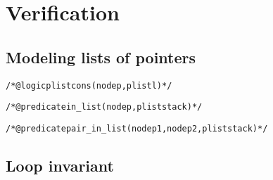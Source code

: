 
\section{Verification}
\label{sec:proof}

\subsection{Modeling lists of pointers}

\begin{alltt}
\begin{slshape}
/*@ logic plist cons(node p, plist l) */

/*@ predicate in_list(node p,plist stack) */

/*@ predicate pair_in_list(node p1,node p2, plist stack) */
\end{slshape}
\end{alltt}


\subsection{Loop invariant}

